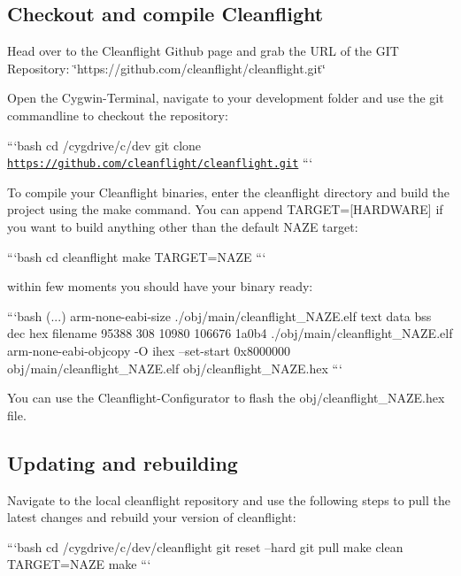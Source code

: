 \subsection*{Checkout and compile Cleanflight}

Head over to the Cleanflight Github page and grab the U\+R\+L of the G\+I\+T Repository\+: \char`\"{}https\+://github.\+com/cleanflight/cleanflight.\+git\char`\"{}

Open the Cygwin-\/\+Terminal, navigate to your development folder and use the git commandline to checkout the repository\+:

```bash cd /cygdrive/c/dev git clone \href{https://github.com/cleanflight/cleanflight.git}{\tt https\+://github.\+com/cleanflight/cleanflight.\+git} ``` 



To compile your Cleanflight binaries, enter the cleanflight directory and build the project using the make command. You can append T\+A\+R\+G\+E\+T=\mbox{[}H\+A\+R\+D\+W\+A\+R\+E\mbox{]} if you want to build anything other than the default N\+A\+Z\+E target\+:

```bash cd cleanflight make T\+A\+R\+G\+E\+T=N\+A\+Z\+E ```



within few moments you should have your binary ready\+:

```bash (...) arm-\/none-\/eabi-\/size ./obj/main/cleanflight\+\_\+\+N\+A\+Z\+E.elf text data bss dec hex filename 95388 308 10980 106676 1a0b4 ./obj/main/cleanflight\+\_\+\+N\+A\+Z\+E.elf arm-\/none-\/eabi-\/objcopy -\/\+O ihex --set-\/start 0x8000000 obj/main/cleanflight\+\_\+\+N\+A\+Z\+E.\+elf obj/cleanflight\+\_\+\+N\+A\+Z\+E.\+hex ```

You can use the Cleanflight-\/\+Configurator to flash the {\ttfamily obj/cleanflight\+\_\+\+N\+A\+Z\+E.\+hex} file.

\subsection*{Updating and rebuilding}

Navigate to the local cleanflight repository and use the following steps to pull the latest changes and rebuild your version of cleanflight\+:

```bash cd /cygdrive/c/dev/cleanflight git reset --hard git pull make clean T\+A\+R\+G\+E\+T=N\+A\+Z\+E make ``` 